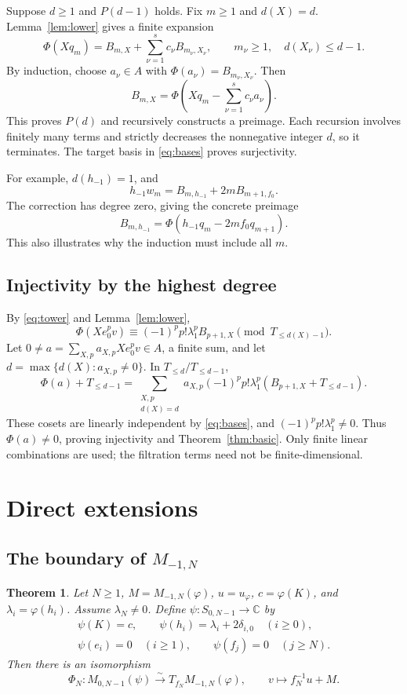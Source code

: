 \documentclass[11pt]{article}
\newcommand{\C}{\mathbb C}
\newtheorem{theorem}{Theorem}
\begin{document}
Suppose \(d\ge1\) and \(P(d-1)\) holds. Fix \(m\ge1\) and \(d(X)=d\).
Lemma~\ref{lem:lower} gives a finite expansion
\[
 \Phi(Xq_m)=B_{m,X}+\sum_{\nu=1}^{s}c_\nu B_{m_\nu,X_\nu},
 \qquad m_\nu\ge1,\quad d(X_\nu)\le d-1.
\]
By induction, choose \(a_\nu\in A\) with
\(\Phi(a_\nu)=B_{m_\nu,X_\nu}\). Then
\[
 B_{m,X}=\Phi\left(Xq_m-\sum_{\nu=1}^{s}c_\nu a_\nu\right).
\]
This proves \(P(d)\) and recursively constructs a preimage.
Each recursion involves finitely many terms and strictly decreases the
nonnegative integer \(d\), so it terminates.
The target basis in \eqref{eq:bases} proves surjectivity.

For example, \(d(h_{-1})=1\), and
\[
 h_{-1}w_m=B_{m,h_{-1}}+2mB_{m+1,f_0}.
\]
The correction has degree zero, giving the concrete preimage
\[
 B_{m,h_{-1}}=\Phi(h_{-1}q_m-2mf_0q_{m+1}).
\]
This also illustrates why the induction must include all \(m\).

\subsection{Injectivity by the highest degree}

By \eqref{eq:tower} and Lemma~\ref{lem:lower},
\begin{equation}\label{eq:leading}
 \Phi(Xe_0^pv)\equiv(-1)^pp!\lambda_1^p B_{p+1,X}
       \pmod{T_{\le d(X)-1}}.
\end{equation}
Let \(0\ne a=\sum_{X,p}a_{X,p}Xe_0^pv\in A\), a finite sum, and let
\(d=\max\{d(X):a_{X,p}\ne0\}\). In \(T_{\le d}/T_{\le d-1}\),
\[
 \Phi(a)+T_{\le d-1}
 =\sum_{\substack{X,p\\d(X)=d}}
    a_{X,p}(-1)^pp!\lambda_1^p
       (B_{p+1,X}+T_{\le d-1}).
\]
These cosets are linearly independent by \eqref{eq:bases}, and
\((-1)^pp!\lambda_1^p\ne0\). Thus \(\Phi(a)\ne0\), proving injectivity
and Theorem~\ref{thm:basic}.
Only finite linear combinations are used; the filtration terms need not be
finite-dimensional.

\section{Direct extensions}

\subsection{The boundary of \texorpdfstring{\(M_{-1,N}\)}{M(-1,N)}}

\begin{theorem}\label{thm:N}
Let \(N\ge1\), \(M=M_{-1,N}(\varphi)\), \(u=u_\varphi\),
\(c=\varphi(K)\), and \(\lambda_i=\varphi(h_i)\).
Assume \(\lambda_N\ne0\). Define \(\psi:S_{0,N-1}\to\C\) by
\[
\begin{gathered}
 \psi(K)=c,\qquad \psi(h_i)=\lambda_i+2\delta_{i,0}\quad(i\ge0),\\
 \psi(e_i)=0\quad(i\ge1),\qquad \psi(f_j)=0\quad(j\ge N).
\end{gathered}
\]
Then there is an isomorphism
\[
 \Phi_N:M_{0,N-1}(\psi)\xrightarrow{\ \sim\ }T_{f_N}M_{-1,N}(\varphi),
 \qquad v\longmapsto f_N^{-1}u+M.
\]
\end{theorem}
\end{document}
